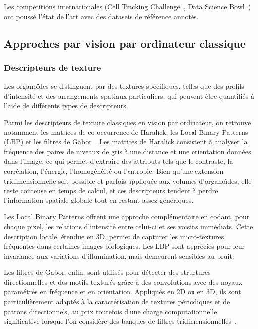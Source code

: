 Les compétitions internationales (Cell Tracking Challenge~\cite{Ulman2017}, Data Science Bowl~\cite{Caicedo2019}) ont poussé l'état de l'art avec des datasets de référence annotés.

\subsection{Approches par vision par ordinateur classique}

\subsubsection{Descripteurs de texture}

Les organoïdes se distinguent par des textures spécifiques, telles que des profils d’intensité et des arrangements spatiaux particuliers, qui peuvent être quantifiés à l’aide de différents types de descripteurs.

Parmi les descripteurs de texture classiques en vision par ordinateur, on retrouve notamment les matrices de co-occurrence de Haralick, les Local Binary Patterns (LBP) et les filtres de Gabor~\cite{Haralick1973, Ojala2002, Fogel1989}. Les matrices de Haralick consistent à analyser la fréquence des paires de niveaux de gris à une distance et une orientation données dans l’image, ce qui permet d’extraire des attributs tels que le contraste, la corrélation, l’énergie, l’homogénéité ou l’entropie. Bien qu’une extension tridimensionnelle soit possible et parfois appliquée aux volumes d’organoïdes, elle reste coûteuse en temps de calcul, et ces descripteurs tendent à perdre l’information spatiale globale tout en restant assez génériques.

Les Local Binary Patterns offrent une approche complémentaire en codant, pour chaque pixel, les relations d’intensité entre celui-ci et ses voisins immédiats. Cette description locale, étendue en 3D, permet de capturer les micro-textures fréquentes dans certaines images biologiques. Les LBP sont appréciés pour leur invariance aux variations d’illumination, mais demeurent sensibles au bruit.

Les filtres de Gabor, enfin, sont utilisés pour détecter des structures directionnelles et des motifs texturés grâce à des convolutions avec des noyaux paramétrés en fréquence et en orientation. Appliqués en 2D ou en 3D, ils sont particulièrement adaptés à la caractérisation de textures périodiques et de patrons directionnels, au prix toutefois d’une charge computationnelle significative lorsque l’on considère des banques de filtres tridimensionnelles~\cite{Fogel1989}.

